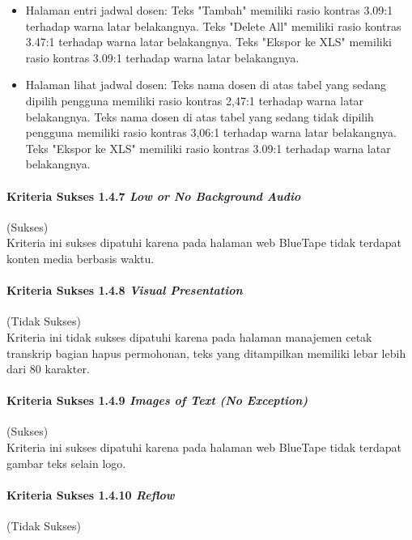 \begin{itemize}
    \item Halaman entri jadwal dosen: Teks "Tambah" memiliki rasio kontras 3.09:1 terhadap warna latar belakangnya. Teks "Delete All" memiliki rasio kontras 3.47:1 terhadap warna latar belakangnya. Teks "Ekspor ke XLS" memiliki rasio kontras 3.09:1 terhadap warna latar belakangnya.
    \item Halaman lihat jadwal dosen: Teks nama dosen di atas tabel yang sedang dipilih pengguna memiliki rasio kontras 2,47:1 terhadap warna latar belakangnya. Teks nama dosen di atas tabel yang sedang tidak dipilih pengguna memiliki rasio kontras 3,06:1 terhadap warna latar belakangnya. Teks "Ekspor ke XLS" memiliki rasio kontras 3.09:1 terhadap warna latar belakangnya.
\end{itemize}

\paragraph{Kriteria Sukses 1.4.7 \textit{Low or No Background Audio}}
\label{par:kepatuhan_bluetape_kriteria_sukses_1.4.7}
(Sukses)\\

Kriteria ini sukses dipatuhi karena pada halaman web BlueTape tidak terdapat konten media berbasis waktu.

\paragraph{Kriteria Sukses 1.4.8 \textit{Visual Presentation}}
\label{par:kepatuhan_bluetape_kriteria_sukses_1.4.8}
(Tidak Sukses)\\

Kriteria ini tidak sukses dipatuhi karena pada halaman manajemen cetak transkrip bagian hapus permohonan, teks yang ditampilkan memiliki lebar lebih dari 80 karakter.

\paragraph{Kriteria Sukses 1.4.9 \textit{Images of Text (No Exception)}}
\label{par:kepatuhan_bluetape_kriteria_sukses_1.4.9}
(Sukses)\\

Kriteria ini sukses dipatuhi karena pada halaman web BlueTape tidak terdapat gambar teks selain logo.

\paragraph{Kriteria Sukses 1.4.10 \textit{Reflow}}
\label{par:kepatuhan_bluetape_kriteria_sukses_1.4.10}
(Tidak Sukses)\\

